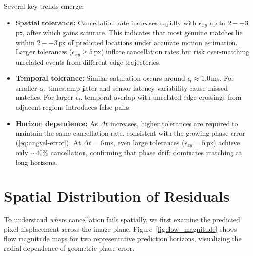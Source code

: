 Several key trends emerge:

\begin{itemize}
\item \textbf{Spatial tolerance:} Cancellation rate increases rapidly with $\epsilon_{xy}$ up to $2--3$\,px, after which gains saturate. This indicates that most genuine matches lie within $2--3$\,px of predicted locations under accurate motion estimation. Larger tolerances ($\epsilon_{xy} \geq 5$\,px) inflate cancellation rates but risk over-matching unrelated events from different edge trajectories.
\item \textbf{Temporal tolerance:} Similar saturation occurs around $\epsilon_t \approx 1.0$\,ms. For smaller $\epsilon_t$, timestamp jitter and sensor latency variability cause missed matches. For larger $\epsilon_t$, temporal overlap with unrelated edge crossings from adjacent regions introduces false pairs.
\item \textbf{Horizon dependence:} As $\Delta t$ increases, higher tolerances are required to maintain the same cancellation rate, consistent with the growing phase error (\eqref{eq:angvel-error}). At $\Delta t=6$\,ms, even large tolerances ($\epsilon_{xy}=5$\,px) achieve only $\sim 40\%$ cancellation, confirming that phase drift dominates matching at long horizons.
\end{itemize}


%   

\section{Spatial Distribution of Residuals}

To understand \emph{where} cancellation fails spatially, we first examine the predicted pixel displacement across the image plane. Figure~\ref{fig:flow_magnitude} shows flow magnitude maps for two representative prediction horizons, visualizing the radial dependence of geometric phase error.

